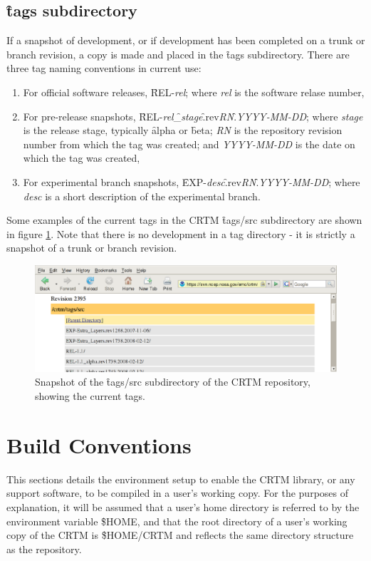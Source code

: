 \section{\f{tags} subdirectory}
If a snapshot of development, or if development has been completed on a trunk or branch revision, a copy is made and placed in the \f{tags} subdirectory. There are three tag naming conventions in current use:
\begin{enumerate}
  \item For official software releases, \f{REL-}\textit{rel}; where \textit{rel} is the software relase number,
  \item For pre-release snapshots, \f{REL-}\textit{rel}\f{\_}\textit{stage}\f{.rev}\textit{RN}\f{.}\textit{YYYY-MM-DD}; where \textit{stage} is the release stage, typically \f{alpha} or \f{beta}; \textit{RN} is the repository revision number from which the tag was created; and \textit{YYYY-MM-DD} is the date on which the tag was created,
  \item For experimental branch snapshots, \f{EXP-}\textit{desc}\f{.rev}\textit{RN}\f{.}\textit{YYYY-MM-DD}; where \textit{desc} is a short description of the experimental branch.
\end{enumerate}
Some examples of the current tags in the CRTM \f{tags/src} subdirectory are shown in figure \ref{fig:tags_src_repository}. Note that there is no development in a tag directory - it is strictly a snapshot of a trunk or branch revision.

\begin{figure}[htb]
  \centering
  \includegraphics[scale=0.5]{graphics/tags_src_repository.eps}
  \caption{Snapshot of the \f{tags/src} subdirectory of the CRTM repository, showing the current tags.}
  \label{fig:tags_src_repository}
\end{figure}


\chapter{Build Conventions}
This sections details the environment setup to enable the CRTM library, or any support software, to be compiled in a user's working copy. For the purposes of explanation, it will be assumed that a user's home directory is referred to by the environment variable \f{\$HOME}, and that the root directory of a user's working copy of the CRTM is \f{\$HOME/CRTM} and reflects the same directory structure as the repository.

